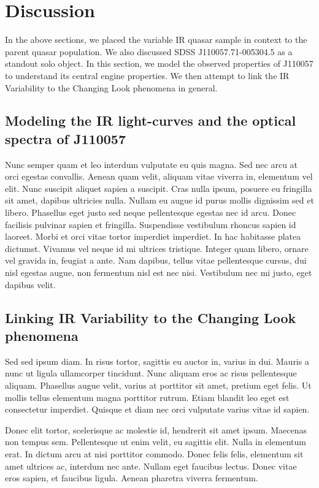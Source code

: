 \documentclass{emulateapj}
\begin{document}
\section{Discussion}
In the above sections, we placed the variable IR quasar sample in context to 
the parent quasar population. We also discussed SDSS J110057.71-005304.5 
as a standout solo object. In this section, we model the observed properties 
of J110057 to understand its central engine properties. We then attempt to 
link the IR Variability to the Changing Look phenomena in general. 

\subsection{Modeling the IR light-curves and the optical spectra of J110057}
Nunc semper quam et leo interdum vulputate eu quis magna. Sed nec arcu
at orci egestas convallis. Aenean quam velit, aliquam vitae viverra
in, elementum vel elit. Nunc suscipit aliquet sapien a suscipit. Cras
nulla ipsum, posuere eu fringilla sit amet, dapibus ultricies
nulla. Nullam eu augue id purus mollis dignissim sed et
libero. Phasellus eget justo sed neque pellentesque egestas nec id
arcu. Donec facilisis pulvinar sapien et fringilla. Suspendisse
vestibulum rhoncus sapien id laoreet. Morbi et orci vitae tortor
imperdiet imperdiet. In hac habitasse platea dictumst. Vivamus vel
neque id mi ultrices tristique. Integer quam libero, ornare vel
gravida in, feugiat a ante. Nam dapibus, tellus vitae pellentesque
cursus, dui nisl egestas augue, non fermentum nisl est nec
nisi. Vestibulum nec mi justo, eget dapibus velit.

\subsection{Linking IR Variability to the Changing Look phenomena}
Sed sed ipsum diam. In risus tortor, sagittis eu auctor in, varius in dui. Mauris a nunc ut ligula ullamcorper tincidunt. Nunc aliquam eros ac risus pellentesque aliquam. Phasellus augue velit, varius at porttitor sit amet, pretium eget felis. Ut mollis tellus elementum magna porttitor rutrum. Etiam blandit leo eget est consectetur imperdiet. Quisque et diam nec orci vulputate varius vitae id sapien.

Donec elit tortor, scelerisque ac molestie id, hendrerit sit amet ipsum. Maecenas non tempus sem. Pellentesque ut enim velit, eu sagittis elit. Nulla in elementum erat. In dictum arcu at nisi porttitor commodo. Donec felis felis, elementum sit amet ultrices ac, interdum nec ante. Nullam eget faucibus lectus. Donec vitae eros sapien, et faucibus ligula. Aenean pharetra viverra fermentum.
\end{document}
